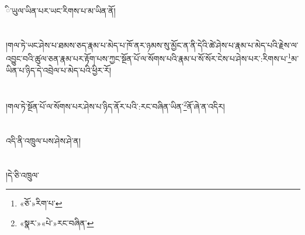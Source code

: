 ི་ཡུལ་ཡིན་པར་ཡང་རིགས་པ་མ་ཡིན་ནོ།\chapter{ }།གལ་ཏེ་ཡང་ཤེས་པ་ཐམས་ཅད་རྣམ་པ་མེད་པ་ཁོ་ནར་ཉམས་སུ་མྱོང་ན་ནི་དེའི་ཚེ་ཤེས་པ་རྣམ་པ་མེད་པའི་རྗེས་ལ་འབྱུང་བའི་ཚུལ་ཅན་རྣམ་པར་རྟོག་པས་ཀྱང་སྔོན་པོ་ལ་སོགས་པའི་རྣམ་པ་སོ་སོར་ངེས་པ་ཤེས་པར་:རིགས་པ་\footnote{«ཅོ་»རིག་པ་}མ་ཡིན་པ་ཉིད་དེ་འབྲེལ་པ་མེད་པའི་ཕྱིར་རོ།\chapter{ }།གལ་ཏེ་སྔོན་པོ་ལ་སོགས་པར་ཤེས་པ་ཉིད་ནོར་པའི་:རང་བཞིན་ཡིན་\footnote{«སྣར་»«པེ་»རང་བཞིན་}ནོ་ཞེ་ན་འདིར།\chapter{ }འདི་ནི་འཁྲུལ་པས་ཤེས་ཤེ་ན།\chapter{ }།དེ་ཅི་འཁྲུལ་